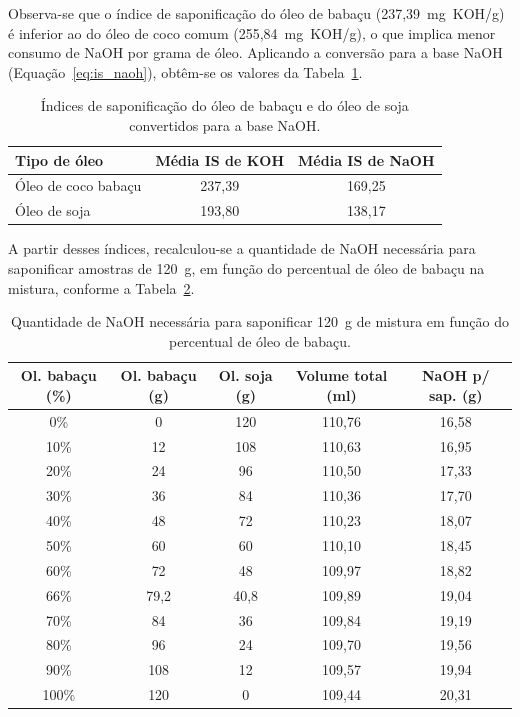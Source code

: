 Observa-se que o índice de saponificação do óleo de babaçu (237,39~mg~KOH/g) é inferior ao do óleo de coco comum (255,84~mg~KOH/g), o que implica menor consumo de NaOH por grama de óleo. Aplicando a conversão para a base NaOH (Equação~\ref{eq:is_naoh}), obtêm-se os valores da Tabela~\ref{tab:is_naoh_babacu}.

\begin{table}[H]
    \centering
    \footnotesize
    \caption{Índices de saponificação do óleo de babaçu e do óleo de soja convertidos para a base NaOH.}
    \label{tab:is_naoh_babacu}
    \begin{tabular}{lcc}
        \toprule
        \textbf{Tipo de óleo} & \textbf{Média IS de KOH} & \textbf{Média IS de NaOH} \\
        \midrule
        Óleo de coco babaçu & 237,39 & 169,25 \\
        Óleo de soja & 193,80 & 138,17 \\
        \bottomrule
    \end{tabular}
\end{table}

A partir desses índices, recalculou-se a quantidade de NaOH necessária para saponificar amostras de 120~g, em função do percentual de óleo de babaçu na mistura, conforme a Tabela~\ref{tab:naoh_babacu}.

\begin{table}[H]
    \centering
    \footnotesize
    \caption{Quantidade de NaOH necessária para saponificar 120~g de mistura em função do percentual de óleo de babaçu.}
    \label{tab:naoh_babacu}
    \begin{tabular}{ccccc}
        \toprule
        \textbf{Ol. babaçu (\%)} & \textbf{Ol. babaçu (g)} & \textbf{Ol. soja (g)} & \textbf{Volume total (ml)} & \textbf{NaOH p/ sap. (g)} \\
        \midrule
        0\%   & 0     & 120   & 110,76 & 16,58 \\
        10\%  & 12    & 108   & 110,63 & 16,95 \\
        20\%  & 24    & 96    & 110,50 & 17,33 \\
        30\%  & 36    & 84    & 110,36 & 17,70 \\
        40\%  & 48    & 72    & 110,23 & 18,07 \\
        50\%  & 60    & 60    & 110,10 & 18,45 \\
        60\%  & 72    & 48    & 109,97 & 18,82 \\
        66\%  & 79,2  & 40,8  & 109,89 & 19,04 \\
        70\%  & 84    & 36    & 109,84 & 19,19 \\
        80\%  & 96    & 24    & 109,70 & 19,56 \\
        90\%  & 108   & 12    & 109,57 & 19,94 \\
        100\% & 120   & 0     & 109,44 & 20,31 \\
        \bottomrule
    \end{tabular}
\end{table}

